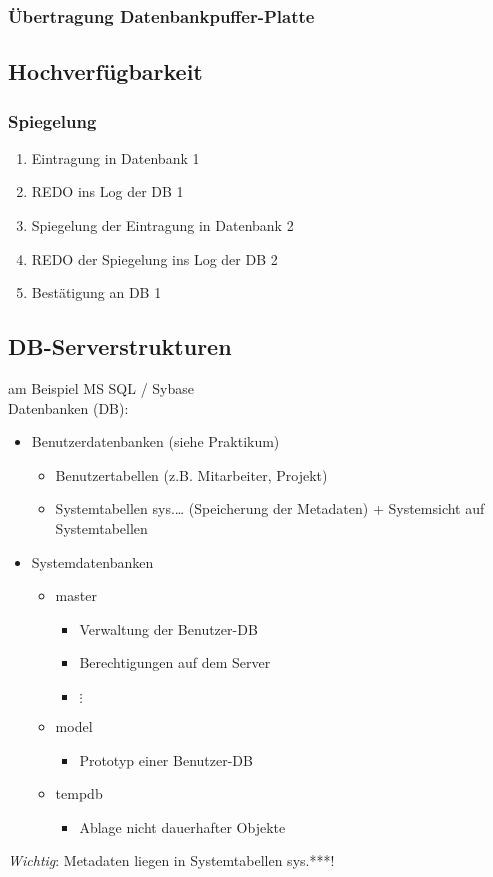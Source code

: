 \subsubsection{Übertragung Datenbankpuffer-Platte}
\subsection{Hochverfügbarkeit}
\subsubsection{Spiegelung}
\begin{enumerate}
\item Eintragung in Datenbank 1
\item REDO ins Log der DB 1
\item Spiegelung der Eintragung in Datenbank 2
\item REDO der Spiegelung ins Log der DB 2
\item Bestätigung an DB 1
\end{enumerate}

\subsection{DB-Serverstrukturen}
am Beispiel MS SQL / Sybase\\
Datenbanken (DB):
\begin{itemize}
\item Benutzerdatenbanken (siehe Praktikum)
\begin{itemize}
\item Benutzertabellen (z.B. Mitarbeiter, Projekt)
\item Systemtabellen sys.… (Speicherung der Metadaten) + Systemsicht auf Systemtabellen
\end{itemize}
\item Systemdatenbanken
\begin{itemize}
\item master
\begin{itemize}
\item Verwaltung der Benutzer-DB
\item Berechtigungen auf dem Server
\item[] $\vdots$
\end{itemize}
\item model
\begin{itemize}
\item Prototyp einer Benutzer-DB
\end{itemize}
\item tempdb
\begin{itemize}
\item Ablage nicht dauerhafter Objekte
\end{itemize}
\end{itemize}
\end{itemize}
\emph{Wichtig}: Metadaten liegen in Systemtabellen sys.***!

